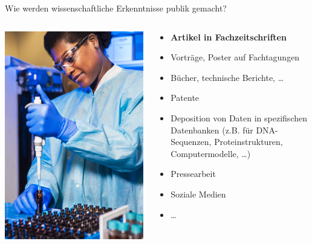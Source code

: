 \documentclass{beamer}
\begin{document}
\begin{frame}{Wie werden wissenschaftliche Erkenntnisse publik gemacht?}

\begin{columns}[c]
    \begin{column}{5cm}
\includegraphics[width=\textwidth]{cdc-_N7I1JyPYJw-unsplash.jpg}        
    \end{column}
        \begin{column}{7cm}
        \begin{itemize}
            \item 
            \textbf{Artikel in Fachzeitschriften}
            \item 
            Vorträge, Poster auf Fachtagungen
            \item 
            Bücher, technische Berichte, \dots 
            \item 
            Patente
            \item 
            Deposition von Daten in spezifischen Datenbanken (z.B. für DNA-Sequenzen, Proteinstrukturen, Computermodelle, \dots)
            \item 
            Pressearbeit
            \item 
            Soziale Medien
 \item 
            \dots
        \end{itemize}
    \end{column}


\end{columns}
\end{frame}
\end{document}
